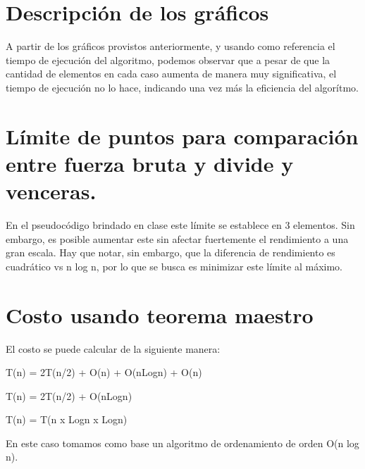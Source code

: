 \documentclass[paper=a4, fontsize=11pt]{scrartcl} %
\numberwithin{equation}{section} %
\numberwithin{figure}{section} %
\numberwithin{table}{section} %
\begin{document}
\section{Descripción de los gráficos}\label{sec:descripción-de-los-gráficos}

A partir de los gráficos provistos anteriormente, y usando como referencia el tiempo de ejecución
del algoritmo, podemos observar que a pesar de que la cantidad de elementos en cada caso
aumenta de manera muy significativa, el tiempo de ejecución no lo hace, indicando una vez más
la eficiencia del algorítmo.

\section{Límite de puntos para comparación entre fuerza bruta y divide y venceras.}\label{sec:comparación-entre-fuerza-bruta-y-divide-y-venceras.}

En el pseudocódigo brindado en clase este límite se establece en 3 elementos. Sin embargo, es
posible aumentar este sin afectar fuertemente el rendimiento a una gran escala. Hay que notar,
sin embargo, que la diferencia de rendimiento es cuadrático vs n log n, por lo que se busca es
minimizar este límite al máximo.

\section{Costo usando teorema maestro}\label{sec:costo-usando-teorema-maestro}

El costo se puede calcular de la siguiente manera:

T(n) = 2T(n/2) + O(n) + O(nLogn) + O(n)

T(n) = 2T(n/2) + O(nLogn)

T(n) = T(n x Logn x Logn)


En este caso tomamos como base un algoritmo de ordenamiento de orden O(n log n).


\end{document}
